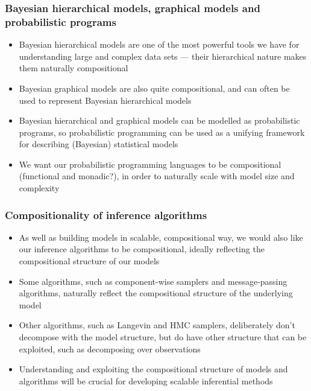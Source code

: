 \documentclass[mathserif,handout]{beamer}
\begin{document}
\begin{frame}
  \frametitle{Bayesian hierarchical models, graphical models and probabilistic programs}
  \begin{itemize}
  \item Bayesian hierarchical models are one of the most powerful tools we have for understanding large and complex data sets --- their hierarchical nature makes them naturally compositional
  \item Bayesian graphical models are also quite compositional, and can often be used to represent Bayesian hierarchical models
  \item Bayesian hierarchical and graphical models can be modelled as probabilistic programs, so probabilistic programming can be used as a unifying framework for describing (Bayesian) statistical models
    \item We want our probabilistic programming languages to be compositional (functional and monadic?), in order to naturally scale with model size and complexity
  \end{itemize}
\end{frame}


\begin{frame}
  \frametitle{Compositionality of inference algorithms}
  \begin{itemize}
  \item As well as building \alert{models} in scalable, compositional way, we would also like our \alert{inference algorithms} to be compositional, ideally reflecting the compositional structure of our models
  \item Some algorithms, such as component-wise samplers and message-passing algorithms, naturally reflect the compositional structure of the underlying model
  \item Other algorithms, such as Langevin and HMC samplers, deliberately don't decompose with the model structure, but do have other structure that can be exploited, such as decomposing over observations
    \item Understanding and exploiting the \alert{compositional structure} of models and algorithms will be crucial for developing scalable inferential methods
  \end{itemize}
\end{frame}
\end{document}
